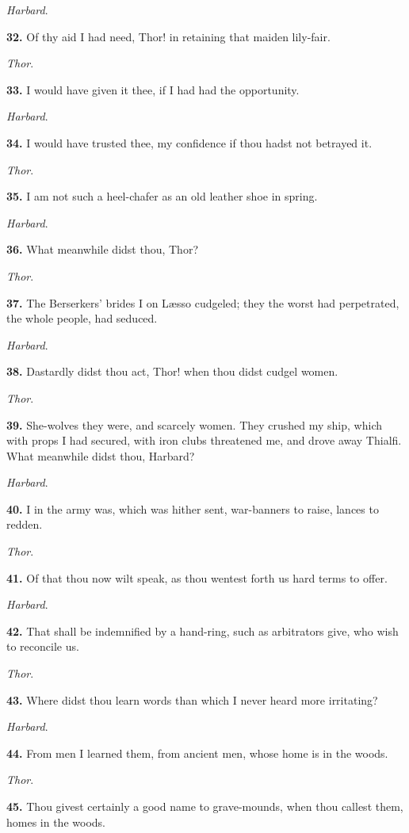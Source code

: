 \emph{Harbard}.

\textbf{32.} Of thy aid I had need, Thor! in retaining that maiden lily-fair.

\emph{Thor}.

\textbf{33.} I would have given it thee, if I had had the opportunity.

\emph{Harbard}.

\textbf{34.} I would have trusted thee, my confidence if thou hadst not
betrayed it.

\emph{Thor}.

\textbf{35.} I am not such a heel-chafer as an old leather shoe in spring.

\emph{Harbard}.

\textbf{36.} What meanwhile didst thou, Thor?

\emph{Thor}.

\textbf{37.} The Berserkers' brides I on Læsso cudgeled; they the worst had
perpetrated, the whole people, had seduced.

\emph{Harbard}.

\textbf{38.} Dastardly didst thou act, Thor! when thou didst cudgel women.

\emph{Thor}.

\textbf{39.} She-wolves they were, and scarcely women. They crushed my ship,
which with props I had secured, with iron clubs threatened me, and
drove away Thialfi. What meanwhile didst thou, Harbard?

\emph{Harbard}.

\textbf{40.} I in the army was, which was hither sent, war-banners to raise,
lances to redden.

\emph{Thor}.

\textbf{41.} Of that thou now wilt speak, as thou wentest forth us hard terms
to offer.

\emph{Harbard}.

\textbf{42.} That shall be indemnified by a hand-ring, such as arbitrators
give, who wish to reconcile us.

\emph{Thor}.

\textbf{43.} Where didst thou learn words than which I never heard more
irritating?

\emph{Harbard}.

\textbf{44.} From men I learned them, from ancient men, whose home is in the
woods.

\emph{Thor}.

\textbf{45.} Thou givest certainly a good name to grave-mounds, when thou
callest them, homes in the woods.


